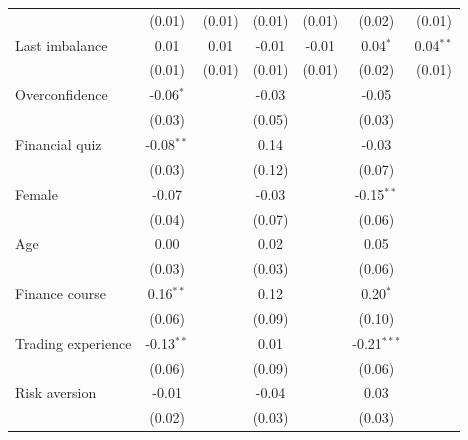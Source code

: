 \begin{tabular}{lcccccc}
                                  & (0.01)       & (0.01)       & (0.01)       & (0.01)       & (0.02)        & (0.01)\\   
   Last imbalance                 & 0.01         & 0.01         & -0.01        & -0.01        & 0.04$^{*}$    & 0.04$^{**}$\\   
                                  & (0.01)       & (0.01)       & (0.01)       & (0.01)       & (0.02)        & (0.01)\\   
   Overconfidence                 & -0.06$^{*}$  &              & -0.03        &              & -0.05         &   \\   
                                  & (0.03)       &              & (0.05)       &              & (0.03)        &   \\   
   Financial quiz                 & -0.08$^{**}$ &              & 0.14         &              & -0.03         &   \\   
                                  & (0.03)       &              & (0.12)       &              & (0.07)        &   \\   
   Female                         & -0.07        &              & -0.03        &              & -0.15$^{**}$  &   \\   
                                  & (0.04)       &              & (0.07)       &              & (0.06)        &   \\   
   Age                            & 0.00         &              & 0.02         &              & 0.05          &   \\   
                                  & (0.03)       &              & (0.03)       &              & (0.06)        &   \\   
   Finance course                 & 0.16$^{**}$  &              & 0.12         &              & 0.20$^{*}$    &   \\   
                                  & (0.06)       &              & (0.09)       &              & (0.10)        &   \\   
   Trading experience             & -0.13$^{**}$ &              & 0.01         &              & -0.21$^{***}$ &   \\   
                                  & (0.06)       &              & (0.09)       &              & (0.06)        &   \\   
   Risk aversion                  & -0.01        &              & -0.04        &              & 0.03          &   \\   
                                  & (0.02)       &              & (0.03)       &              & (0.03)        &   \\   

\end{tabular}
